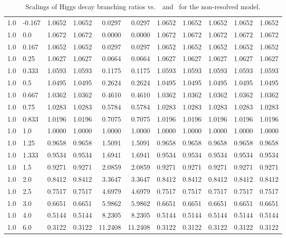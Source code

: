 \begin{table}[h!]
\begin{tabular}{ll rrrrrrrrr}
   1.0  & -0.167 & 1.0652 & 1.0652 & 0.0297     & 0.0297    & 1.0652 & 1.0652 & 1.0652          & 1.0652     & 1.0652 \\
   1.0  & 0.0    & 1.0672 & 1.0672 & 0.0000     & 0.0000    & 1.0672 & 1.0672 & 1.0672          & 1.0672     & 1.0672 \\
   1.0  & 0.167  & 1.0652 & 1.0652 & 0.0297     & 0.0297    & 1.0652 & 1.0652 & 1.0652          & 1.0652     & 1.0652 \\
   1.0  & 0.25   & 1.0627 & 1.0627 & 0.0664     & 0.0664    & 1.0627 & 1.0627 & 1.0627          & 1.0627     & 1.0627 \\
   1.0  & 0.333  & 1.0593 & 1.0593 & 0.1175     & 0.1175    & 1.0593 & 1.0593 & 1.0593          & 1.0593     & 1.0593 \\
   1.0  & 0.5    & 1.0495 & 1.0495 & 0.2624     & 0.2624    & 1.0495 & 1.0495 & 1.0495          & 1.0495     & 1.0495 \\
   1.0  & 0.667  & 1.0362 & 1.0362 & 0.4610     & 0.4610    & 1.0362 & 1.0362 & 1.0362          & 1.0362     & 1.0362 \\
   1.0  & 0.75   & 1.0283 & 1.0283 & 0.5784     & 0.5784    & 1.0283 & 1.0283 & 1.0283          & 1.0283     & 1.0283 \\
   1.0  &  0.833 & 1.0196 & 1.0196 & 0.7075     & 0.7075    & 1.0196 & 1.0196 & 1.0196          & 1.0196     & 1.0196 \\
   1.0  & 1.0    & 1.0000 & 1.0000 & 1.0000     & 1.0000    & 1.0000 & 1.0000 & 1.0000          & 1.0000     & 1.0000 \\
   1.0  & 1.25   & 0.9658 & 0.9658 & 1.5091     & 1.5091    & 0.9658 & 0.9658 & 0.9658          & 0.9658     & 0.9658 \\
   1.0  & 1.333  & 0.9534 & 0.9534 & 1.6941     & 1.6941    & 0.9534 & 0.9534 & 0.9534          & 0.9534     & 0.9534 \\
   1.0  & 1.5    & 0.9271 & 0.9271 & 2.0859     & 2.0859    & 0.9271 & 0.9271 & 0.9271          & 0.9271     & 0.9271 \\
   1.0  & 2.0    & 0.8412 & 0.8412 & 3.3647     & 3.3647    & 0.8412 & 0.8412 & 0.8412          & 0.8412     & 0.8412 \\
   1.0  & 2.5    & 0.7517 & 0.7517 & 4.6979     & 4.6979    & 0.7517 & 0.7517 & 0.7517          & 0.7517     & 0.7517 \\
   1.0  & 3.0    & 0.6651 & 0.6651 & 5.9862     & 5.9862    & 0.6651 & 0.6651 & 0.6651          & 0.6651     & 0.6651 \\
   1.0  & 4.0    & 0.5144 & 0.5144 & 8.2305     & 8.2305    & 0.5144 & 0.5144 & 0.5144          & 0.5144     & 0.5144 \\
   1.0  & 6.0    & 0.3122 & 0.3122 & 11.2408    & 11.2408   & 0.3122 & 0.3122 & 0.3122          & 0.3122     & 0.3122 \\\hline
    \end{tabular}
    \caption[Scalings of Higgs decay branching ratios vs.\ \Ct\ and  ]{Scalings of Higgs decay branching ratios vs.\ \Ct\ and \ for the non-resolved model.}\label{tab:brscalingK6_1}
 \end{table}


